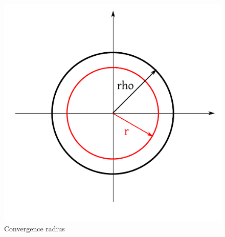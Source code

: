 \documentclass[a4paper,landscape,twocolumn]{article}
\theoremstyle{definition}
\begin{document}
\begin{figure}[!h]
  \begin{center}
    \includegraphics{img/convergence_radius.pdf}
    \caption{Convergence radius}
    \label{fig:convr}
  \end{center}
\end{figure}
\end{document}
